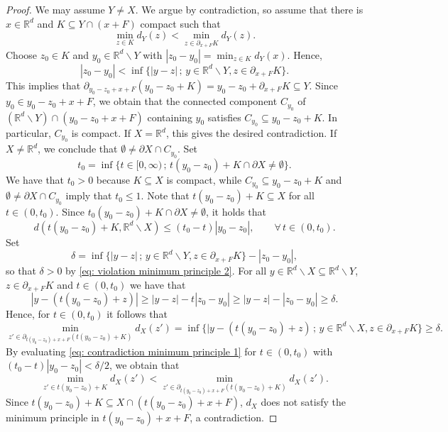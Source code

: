 \documentclass[12pt]{amsart}
\newcommand{\R}{\mathbb{R}}
\theoremstyle{definition}
\theoremstyle{remark}
\numberwithin{equation}{section}
\begin{document}
\begin{proof}
	We may assume $Y\neq X$. We argue by contradiction, so assume that there is $x\in \R^d$ and  $K\subseteq Y\cap(x+F)$ compact such that
$$
		\min_{z\in K}d_Y(z)<\min_{z\in\partial_{x+F}K}d_Y(z).
$$
	Choose $z_0\in K$ and $y_0\in\R^d\backslash Y$ with $|z_0-y_0|=\min_{z\in K}d_Y(x)$.
Hence,
	\begin{equation}\label{eq: violation minimum principle 2}
		|z_0-y_0|<\inf\{|y-z| \,; \, y\in\R^d\backslash Y, z\in \partial_{x+F}K\}.
	\end{equation}
	This implies that $\partial_{y_0-z_0+x+F}(y_0-z_0+K) = y_0-z_0+\partial_{x+F}K \subseteq Y$. Since $y_0 \in y_0-z_0+x+F$, we obtain that the connected component $C_{y_0}$ of $(\R^d\backslash Y)\cap (y_0-z_0+x+F)$ containing $y_0$ satisfies $C_{y_0}\subseteq y_0-z_0+K$. In particular, $C_{y_0}$ is compact. If $X=\R^d$, this gives the desired contradiction. 	If $X\neq\R^d$, we conclude that $\emptyset\neq\partial X\cap C_{y_0}$. Set
	$$t_0=\inf\{t\in[0,\infty) \, ; \,t(y_0-z_0)+K\cap\partial X\neq \emptyset\}.$$
 We have that $t_0 > 0$ because $K \subseteq X$ is compact, while  $C_{y_0}\subseteq y_0-z_0+K$ and $\emptyset\neq\partial X\cap C_{y_0}$ imply that $t_0 \leq 1$. Note that $t(y_0-z_0)+K\subseteq X$ for all $t \in (0,t_0)$. Since $t_0(y_0-z_0)+K\cap\partial X\neq \emptyset$, it holds that
	\begin{equation}\label{eq: contradiction minimum principle 1}
	 d\left(t(y_0-z_0)+K, \R^d\backslash X\right)\leq (t_0-t)|y_0-z_0|, \qquad 	\forall\,t\in (0,t_0).
	\end{equation}
	Set 
	$$\delta=\inf\{|y-z|\, ; \, y\in\R^d\backslash Y, z\in \partial_{x+F}K\}-|z_0-y_0|,$$
	so that $\delta>0$ by \eqref{eq: violation minimum principle 2}. For all $y\in \R^d\backslash X\subseteq\R^d\backslash Y$, $z\in \partial_{x+F}K$ and $t\in (0,t_0)$ we have that
	$$|y-\left(t(y_0-z_0)+z\right)|\geq |y-z|-t|z_0-y_0|\geq|y-z|-|z_0-y_0|\geq\delta.$$
	Hence, for $t\in (0,t_0)$ it follows that
	$$\min_{z'\in\partial_{t(y_0-z_0)+x+F}(t(y_0-z_0)+K)}d_X(z')=\inf\{|y-\left(t(y_0-z_0)+z\right)\,; \, y\in\R^d\backslash X, z\in \partial_{x+F}K\}\geq \delta.$$
	By evaluating \eqref{eq: contradiction minimum principle 1} for $t\in(0,t_0)$ with $(t_0-t)|y_0-z_0|<\delta/2$, we obtain that
	$$\min_{z'\in t(y_0-z_0)+K}d_X(z')<\min_{z'\in\partial_{t(y_0-z_0)+x+F}(t(y_0-z_0)+K)}d_X(z').$$
	Since $t(y_0-z_0)+K \subseteq X \cap (t(y_0-z_0)+ x+ F)$, $d_X$ does not satisfy the minimum principle in $t(y_0-z_0)+ x+ F$, a contradiction.
\end{proof}
\end{document}

